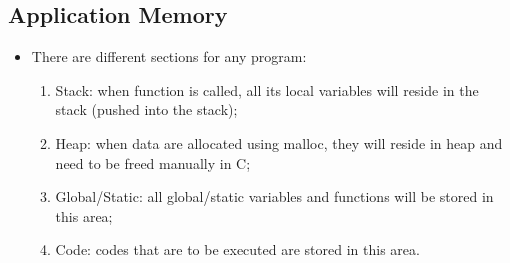 \documentclass{article}
\begin{document}
\subsection{Application Memory}
\begin{itemize}
    \item There are different sections for any program:
        \begin{enumerate}
            \item Stack: when function is called, all its local variables will reside in the stack (pushed into the stack);
            \item Heap: when data are allocated using malloc, they will reside in heap and need to be freed manually in C;
            \item Global/Static: all global/static variables and functions will be stored in this area;
            \item Code: codes that are to be executed are stored in this area.
        \end{enumerate}
\end{itemize}


\newpage
\end{document}
